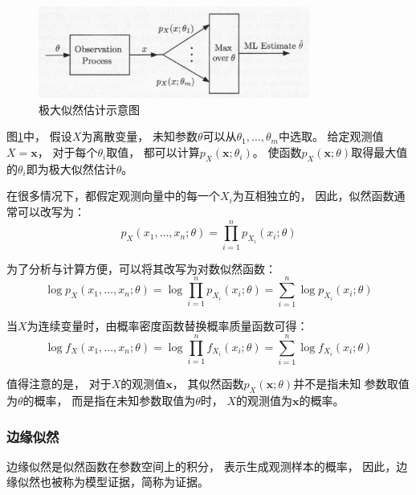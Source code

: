 \begin{figure}[ht]
    \centering
    \includegraphics[width=0.8\textwidth]{figures/maximux_likelihood_estimation}
    \caption{极大似然估计示意图}\label{fig:maximux_likelihood_estimation}
\end{figure}

图{\ref{fig:maximux_likelihood_estimation}}中，
假设{$X$}为离散变量，
未知参数{$\theta$}可以从{$\theta_1,\ldots,\theta_m$}中选取。
给定观测值{$X=\bm{x}$}，
对于每个{$\theta_i$}取值，
都可以计算{$p_X(\bm{x};\theta_i)$}。
使函数{$p_X(\bm{x};\theta)$}取得最大值的{$\theta_i$}即为极大似然估计{$\theta$}。

在很多情况下，都假定观测向量中的每一个{$X_i$}为互相独立的，
因此，似然函数通常可以改写为：
\begin{equation}
    \label{eq:maximux_likelihood_estimation_discrete}
    p_X(x_1,\ldots,x_n;\theta)=\prod_{i=1}^{n}p_{X_i}(x_i;\theta)
\end{equation}

为了分析与计算方便，可以将其改写为对数似然函数：
\begin{equation}
    \label{eq:maximux_likelihood_estimation_discrete_log}
    \log p_X(x_1,\ldots,x_n;\theta)
    =\log \prod_{i=1}^{n}p_{X_i}(x_i;\theta) 
    =\sum_{i=1}^{n} \log p_{X_i}(x_i;\theta)
\end{equation}

当{$X$}为连续变量时，由概率密度函数替换概率质量函数可得：
\begin{equation}
    \label{eq:maximux_likelihood_estimation_continuous_log}
    \log f_X(x_1,\ldots,x_n;\theta)
    =\log \prod_{i=1}^{n}f_{X_i}(x_i;\theta) 
    =\sum_{i=1}^{n} \log f_{X_i}(x_i;\theta)
\end{equation}

值得注意的是，
对于{$X$}的观测值{$\bm{x}$}，
其似然函数{$p_X(\bm{x};\theta)$}并不是指未知 参数取值为{$\theta$}的概率，
而是指在未知参数取值为{$\theta$}时，
{$X$}的观测值为{$\bm{x}$}的概率。

\subsubsection{边缘似然}
边缘似然是似然函数在参数空间上的积分，
表示生成观测样本的概率，
因此，边缘似然也被称为模型证据，简称为证据。




